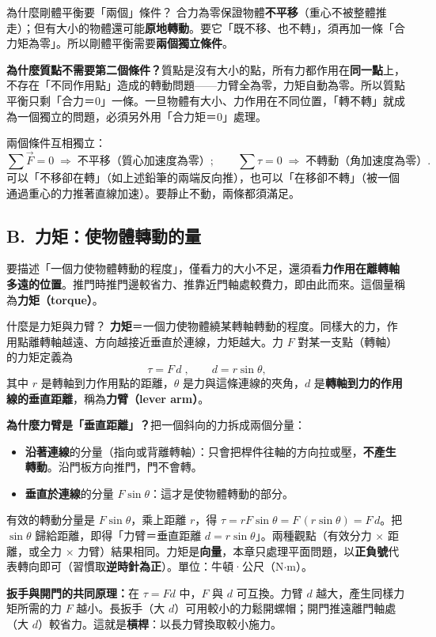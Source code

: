 \documentclass[11pt]{article}
\begin{document}
\begin{補充框}{為什麼剛體平衡要「兩個」條件？}
合力為零保證物體\textbf{不平移}（重心不被整體推走）；但有大小的物體還可能\textbf{原地轉動}。要它「既不移、也不轉」，須再加一條「合力矩為零」。所以剛體平衡需要\textbf{兩個獨立條件}。

\textbf{為什麼質點不需要第二個條件？}質點是沒有大小的點，所有力都作用在\textbf{同一點}上，不存在「不同作用點」造成的轉動問題——力臂全為零，力矩自動為零。所以質點平衡只剩「合力＝0」一條。一旦物體有大小、力作用在不同位置，「轉不轉」就成為一個獨立的問題，必須另外用「合力矩＝0」處理。

兩個條件互相獨立：
$$\sum \vec F = 0 \;\Longrightarrow\; \text{不平移（質心加速度為零）};\qquad
\sum \tau = 0 \;\Longrightarrow\; \text{不轉動（角加速度為零）}.$$
可以「不移卻在轉」（如上述鉛筆的兩端反向推），也可以「在移卻不轉」（被一個通過重心的力推著直線加速）。要靜止不動，兩條都須滿足。
\end{補充框}

\subsection*{\sffamily B.\ 力矩：使物體轉動的量}

要描述「一個力使物體轉動的程度」，僅看力的大小不足，還須看\textbf{力作用在離轉軸多遠的位置}。推門時推門邊較省力、推靠近門軸處較費力，即由此而來。這個量稱為\textbf{力矩（torque）}。

\begin{補充框}{什麼是力矩與力臂？}
\textbf{力矩}＝一個力使物體繞某轉軸轉動的程度。同樣大的力，作用點離轉軸越遠、方向越接近垂直於連線，力矩越大。力 $F$ 對某一支點（轉軸）的力矩定義為
$$\boxed{\;\tau = F\,d\;},\qquad d = r\sin\theta,$$
其中 $r$ 是轉軸到力作用點的距離，$\theta$ 是力與這條連線的夾角，$d$ 是\textbf{轉軸到力的作用線的垂直距離}，稱為\textbf{力臂（lever arm）}。

\textbf{為什麼力臂是「垂直距離」？}把一個斜向的力拆成兩個分量：
\begin{itemize}\setlength{\itemsep}{1pt}
\item \textbf{沿著連線}的分量（指向或背離轉軸）：只會把桿件往軸的方向拉或壓，\textbf{不產生轉動}。沿門板方向推門，門不會轉。
\item \textbf{垂直於連線}的分量 $F\sin\theta$：這才是使物體轉動的部分。
\end{itemize}
有效的轉動分量是 $F\sin\theta$，乘上距離 $r$，得 $\tau = rF\sin\theta = F\,(r\sin\theta)=F\,d$。把 $\sin\theta$ 歸給距離，即得「力臂＝垂直距離 $d=r\sin\theta$」。兩種觀點（有效分力 $\times$ 距離，或全力 $\times$ 力臂）結果相同。力矩是\textbf{向量}，本章只處理平面問題，以\textbf{正負號}代表轉向即可（習慣取\textbf{逆時針為正}）。單位：牛頓·公尺（$\text{N·m}$）。

\textbf{扳手與開門的共同原理：}在 $\tau=Fd$ 中，$F$ 與 $d$ 可互換。力臂 $d$ 越大，產生同樣力矩所需的力 $F$ 越小。長扳手（大 $d$）可用較小的力鬆開螺帽；開門推遠離門軸處（大 $d$）較省力。這就是\textbf{槓桿}：以長力臂換取較小施力。
\end{補充框}
\end{document}
